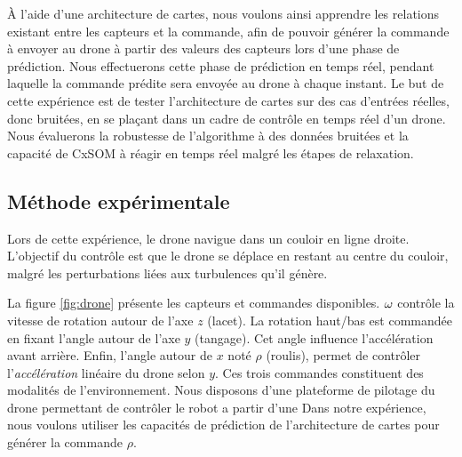 \documentclass[../main]{subfiles}
\begin{document}
\`A l'aide d'une architecture de cartes, nous voulons ainsi apprendre les relations existant entre les capteurs et la commande, afin de pouvoir générer la commande à envoyer au drone à partir des valeurs des capteurs lors d'une phase de prédiction.
Nous effectuerons cette phase de prédiction en temps réel, pendant laquelle la commande prédite sera envoyée au drone à chaque instant.
Le but de cette expérience est de tester l'architecture de cartes sur des cas d'entrées réelles, donc bruitées, en se plaçant dans un cadre de contrôle en temps réel d'un drone.
Nous évaluerons la robustesse de l'algorithme à des données bruitées et la capacité de CxSOM à réagir en temps réel malgré les étapes de relaxation.

\subsection{Méthode expérimentale}

Lors de cette expérience, le drone navigue dans un couloir en ligne droite. L'objectif du contrôle est que le drone se déplace en restant au centre du couloir, malgré les perturbations liées aux turbulences qu'il génère.

La figure \ref{fig:drone} présente les capteurs et commandes disponibles.
$\omega$ contrôle la vitesse de rotation autour de l'axe $z$ (lacet).
La rotation haut/bas est commandée en fixant l'angle autour de l'axe $y$ (tangage). Cet angle influence l'accélération avant arrière.
Enfin, l'angle autour de $x$ noté $\rho$ (roulis), permet de contrôler l'\emph{accélération} linéaire du drone selon $y$.
Ces trois commandes constituent des modalités de l'environnement.
Nous disposons d'une plateforme de pilotage du drone permettant de contrôler le robot a partir d'une 
Dans notre expérience, nous voulons utiliser les capacités de prédiction de l'architecture de cartes pour générer la commande $\rho$.
\end{document}
